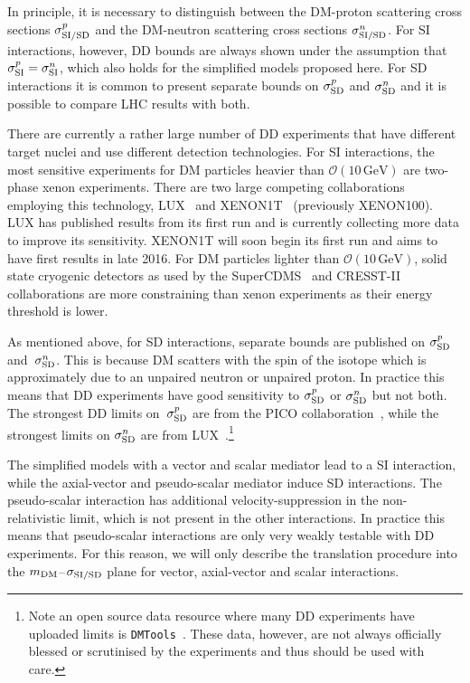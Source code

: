 In principle, it is necessary to distinguish between the DM-proton scattering cross sections  $\sigma^p_{\rm{SI}/\rm{SD}}$ and the DM-neutron scattering cross sections  $\sigma^n_{\rm{SI}/\rm{SD}}$. For  SI interactions, however,  DD bounds are always shown under the assumption that $\sigma^p_{\rm{SI}} = \sigma^n_{\rm{SI}}$, which also holds for the simplified models proposed here. For  SD interactions it is common to present separate bounds on $\sigma^p_{\rm{SD}}$ and $\sigma^n_{\rm{SD}}$ and it is possible to compare  LHC results with both.

There are currently a rather large number of  DD experiments that have different target nuclei and use different detection technologies. For  SI interactions, the most sensitive experiments for DM particles heavier than $\mathcal{O}(10 \, \mathrm{GeV})$ are two-phase xenon experiments. There are two large competing collaborations employing this technology, LUX~\cite{Akerib:2015rjg} and XENON1T~\cite{Aprile:2015uzo} (previously XENON100). LUX has published results from its first run and is currently collecting more data to improve its sensitivity. XENON1T will soon begin its first run and aims to have first results in late 2016. For DM particles lighter than $\mathcal{O}(10 \, \mathrm{GeV})$, solid state cryogenic detectors as used by the SuperCDMS~\cite{Agnese:2015nto} and CRESST-II~\cite{Angloher:2015ewa} collaborations are more constraining than xenon experiments as their energy threshold is lower.

As mentioned above, for  SD interactions, separate bounds are published on $\sigma^p_{\rm{SD}}$ and~$\sigma^n_{\rm{SD}}$. This is because DM scatters with the spin of the isotope which is approximately due to an unpaired neutron or unpaired proton. In practice this means that DD experiments have good sensitivity to $\sigma^p_{\rm{SD}}$ or $\sigma^n_{\rm{SD}}$ but not both. The strongest DD limits on~$\sigma^p_{\rm{SD}}$ are from the PICO collaboration~\cite{Amole:2016pye,Amole:2015pla}, while the strongest limits on $\sigma^n_{\rm{SD}}$ are from LUX~\cite{Akerib:2016lao}.\footnote{Note an open source data resource where many DD experiments have uploaded limits is {\tt DMTools}~\cite{DMTools}. These data, however, are not always officially blessed or scrutinised by the experiments and thus should be used with care.}


The simplified models with a vector and scalar mediator lead to a SI interaction, while the axial-vector and  pseudo-scalar mediator induce SD interactions. The  pseudo-scalar interaction has additional velocity-suppression in the non-relativistic limit, which is not present in the other interactions. In practice this means that  pseudo-scalar interactions are only very weakly testable with  DD experiments. For this reason, we will only describe the translation procedure into the  $m_{\rm{DM}}$--$\hspace{0.25mm} \sigma_{\rm{SI/SD}}$ plane for 
vector, axial-vector and scalar interactions.

